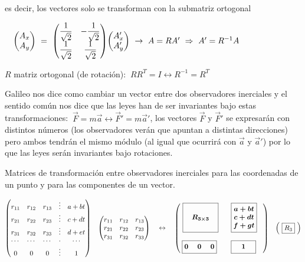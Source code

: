  es decir, los vectores solo se transforman con la submatriz ortogonal

  $\quad \mqty(A_x\\A_y) \ = \ \mqty(
 \dfrac 1{\sqrt{2}} &  -\dfrac 1{\sqrt{2}}  \\
  \dfrac 1{\sqrt{2}}&   \dfrac 1{\sqrt{2}} ) \mqty(A'_x\\A'_y) \ \to \ A=RA' \ \Rightarrow \    A'=R^{-1} A$
  
  $R$ matriz ortogonal (de rotación): $\ RR^T=I \leftrightarrow R^{-1}=R^T$

Galileo nos dice como cambiar un vector entre dos observadores inerciales y el sentido común nos dice que las leyes han de ser invariantes bajo estas transformaciones: $\ \vec F=m\vec a \leftrightarrow \vec F'=m\vec a'$, los vectores $\vec F$ y $\vec F'$ se expresarán con distintos números (los observadores verán que apuntan a distintas direcciones) pero ambos tendrán el mismo módulo (al igual que ocurrirá con $\vec a $ y $\vec a'$) por lo que las leyes serán invariantes bajo rotaciones.



\textcolor{gris}{Matrices de transformación entre observadores inerciales para las coordenadas de un punto y para las componentes de un vector.}

\begin{center}
\textcolor{gris}{
$\mqty(
r_{11}&r_{12}&r_{13}&\vdots&a+bt\\
r_{21}&r_{22}&r_{23}&\vdots&c+dt\\
r_{31}&r_{32}&r_{33}&\vdots&d+et\\
\cdots &\cdots&\cdots&\cdot&\cdots\\
0&0&0&\vdots&1)\quad 
\mqty(
r_{11}&r_{12}&r_{13}\\
r_{21}&r_{22}&r_{23}\\
r_{31}&r_{32}&r_{33}) \quad  \leftrightarrow \quad 
\boldsymbol{
\mqty(\ 
\boxed{ \mqty{ \\ & R_{3\times 3} & \\  \\ } } & \boxed{\mqty{ a+bt\\c+dt\\f+gt}} \\ \\
\boxed{\mqty{ 0&\ 0 \ &0 }} & \ \ \,  \boxed{\mqty{\,  &1&}\, }
\ \ \ )
}\quad  \mqty(\ \boxed{R_3}\ )
$}
\end{center}

\vspace{1cm}

